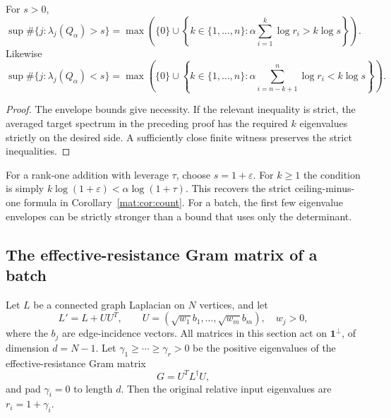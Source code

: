 \begin{corollary}
\label{ah:cor:count}
For $s>0$,
\[
 \sup\#\{j:\lambda_j(Q_\alpha)>s\}
 =\max\left(\{0\}\cup
 \left\{k\in\{1,\ldots,n\}:
 \alpha\sum_{i=1}^k\log r_i>k\log s\right\}\right).
\]
Likewise
\[
 \sup\#\{j:\lambda_j(Q_\alpha)<s\}
 =\max\left(\{0\}\cup
 \left\{k\in\{1,\ldots,n\}:
 \alpha\sum_{i=n-k+1}^n\log r_i<k\log s\right\}\right).
\]
\end{corollary}
\begin{proof}
The envelope bounds give necessity. If the relevant inequality is
strict, the averaged target spectrum in the preceding proof has
the required $k$ eigenvalues strictly on the desired side. A sufficiently
close finite witness preserves the strict inequalities.
\end{proof}

For a rank-one addition with leverage $\tau$, choose $s=1+\varepsilon$.
For $k\ge1$ the condition is simply
$k\log(1+\varepsilon)<\alpha\log(1+\tau)$.
This recovers the strict ceiling-minus-one formula in Corollary~\ref{mat:cor:count}. For a batch, the first few eigenvalue envelopes can be
strictly stronger than a bound that uses only the determinant.

\subsection{The effective-resistance Gram matrix of a batch}
Let $L$ be a connected graph Laplacian on $N$ vertices, and let
\[
 L'=L+UU^T,\qquad
 U=(\sqrt{w_1}b_1,\ldots,\sqrt{w_m}b_m),\quad w_j>0,
\]
where the $b_j$ are edge-incidence vectors.
All matrices in this section act on $\mathbf1^\perp$, of dimension
$d=N-1$. Let $\gamma_1\ge\cdots\ge\gamma_r>0$ be the positive
eigenvalues of the effective-resistance Gram matrix
\[
 G=U^TL^\dagger U,
\]
and pad $\gamma_i=0$ to length $d$. Then the original relative
input eigenvalues are $r_i=1+\gamma_i$.

